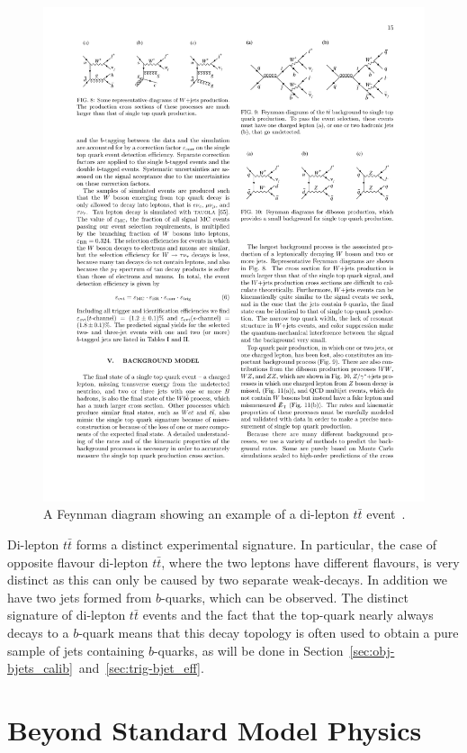 \begin{figure}[!hbt]
  \begin{center}
    \includegraphics[width=0.6\linewidth, angle=0]{figs/Theory/ttbar.pdf}
  \end{center}
  \vspace{-1em}
  \caption[A Feynman diagram showing an example of a di-lepton $t\bar{t}$ event.]
          {A Feynman diagram showing an example of a di-lepton $t\bar{t}$ event~\cite{theo-ttbar_feyn}.}
          \label{fig:theo-ttbar}
  \vspace{-1em}
\end{figure}

Di-lepton $t\bar{t}$ forms a distinct experimental signature.
In particular, the case of opposite flavour di-lepton $t\bar{t}$, where the two leptons have different flavours, is very distinct
as this can only be caused by two separate weak-decays.
In addition we have two jets formed from $b$-quarks, which can be observed.
The distinct signature of di-lepton $t\bar{t}$ events and the fact that the top-quark nearly always decays to a $b$-quark
means that this decay topology is often used to obtain a pure sample of jets containing $b$-quarks,
as will be done in Section~\ref{sec:obj-bjets_calib}~and~\ref{sec:trig-bjet_eff}.

\newpage
\section{Beyond Standard Model Physics}
\label{sec:theo-bsm}

